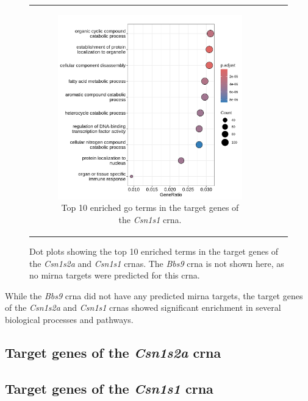 \begin{figure}[H]
\begin{tabular}{ccc}
\begin{subfigure}{0.5\textwidth}
            \includegraphics[width=\linewidth]{chapters/4_results_and_discussion/figures/dea/deseq2/letrozole/chr5:87817372-87821139_targets.txt.png}
            \caption{Top 10 enriched \gls{go} terms in the target
                genes of the \textit{Csn1s1} \gls{crna}.
            }
            \label{fig:tg_csn1s1}
        \end{subfigure}
    \end{tabular}
    \caption{Dot plots showing the top 10 enriched terms in the target genes of
        the \textit{Csn1s2a} and \textit{Csn1s1} \glspl{crna}.
        The \textit{Bbs9} \gls{crna} is not shown here, as no \gls{mirna} targets were
        predicted for this \gls{crna}.
    }
    \label{fig:target_genes}
\end{figure}

While the \textit{Bbs9} \gls{crna} did not have any predicted \gls{mirna}
targets, the target genes of the \textit{Csn1s2a} and \textit{Csn1s1}
\glspl{crna} showed significant enrichment in several biological processes and
pathways.

\subsection{Target genes of the \textit{Csn1s2a} \gls{crna}}

\subsection{Target genes of the \textit{Csn1s1} \gls{crna}}

